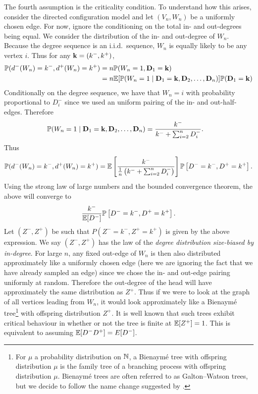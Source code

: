 The fourth assumption is the criticality condition. To understand how this arises, consider the directed configuration model and let $(V_n, W_n)$ be a uniformly chosen edge. For now, ignore the conditioning on the total in- and out-degrees being equal. We consider the distribution of the in- and out-degree of $W_n$. Because the degree sequence is an i.i.d.\ sequence, $W_n$ is equally likely to be any vertex $i$. Thus for any ${\mathbf k} = (k^-, k^+)$,
\begin{align*}
    {\mathbb P}(d^-(W_n) = k^-, d^+(W_n) = k^+)
    &= n {\mathbb P}(W_n = 1, {\mathbf D}_1 = {\mathbf k}) \\
    &= n {\mathbb E}[{\mathbb P}(W_n = 1 \mid {\mathbf D}_1 = {\mathbf k}, {\mathbf D}_2, \ldots, {\mathbf D}_n)] {\mathbb P}({\mathbf D}_1 = {\mathbf k})
\end{align*}
Conditionally on the degree sequence, we have that $W_n = i$ with probability proportional to $D^-_i$ since we used an uniform pairing of the in- and out-half-edges. Therefore
\begin{align*}
    {\mathbb P}(W_n = 1 \mid {\mathbf D}_1 = {\mathbf k}, {\mathbf D}_2, \ldots, {\mathbf D}_n)
    &= \frac{k^-}{k^- + \sum_{i=2}^n D_i^-}.
\end{align*}
Thus
\begin{equation*}
    {\mathbb P}(d^-(W_n) = k^-, d^+(W_n) = k^+) = {\mathbb E}\left[ 
        \frac{k^-}{\frac{1}{n}\left( k^- + \sum_{i=2}^n D_i^- \right)}
    \right]
    {\mathbb P} \left[ D^- = k^-, D^+ = k^+ \right].
\end{equation*}
Using the strong law of large numbers and the bounded convergence theorem, the above will converge to
\begin{equation*}
    \frac{k^-}{{\mathbb E}[D^-]} {\mathbb P}\left[ D^- = k^-, D^+ = k^+ \right].
\end{equation*}
Let $(Z^-, Z^+)$ be such that $P(Z^- = k^-, Z^+ = k^+)$ is given by the above expression. We say $(Z^-, Z^+)$ has the law of the \emph{degree distribution size-biased by in-degree}. For large $n$, any fixed out-edge of $W_n$ is then also distributed approximately like a uniformly chosen edge (here we are ignoring the fact that we have already sampled an edge) since we chose the in- and out-edge pairing uniformly at random. Therefore the out-degree of the head will have approximately the same distribution as $Z^+$. Thus if we were to look at the graph of all vertices leading from $W_n$, it would look approximately like a Bienaymé tree\footnote{For $\mu$ a probability distribution on ${\mathbb N}$, a Bienaymé tree with offspring distribution $\mu$ is the family tree of a branching process with offspring distribution $\mu$. Bienaymé trees are often referred to as Galton--Watson trees, but we decide to follow the name change suggested by \citet{addario-berryUniversalHeightWidth2021}.} with offspring distribution $Z^+$. It is well known that such trees exhibit critical behaviour in whether or not the tree is finite at ${\mathbb E}[Z^+] = 1$. This is equivalent to assuming ${\mathbb E}[D^-D^+] = E[D^-]$.

